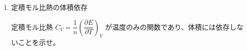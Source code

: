 \documentclass[uplatex,dvipdfmx,a4paper,11pt]{jsarticle}
\newcommand{\diff}{\mathrm d}
\begin{document}
\begin{enumerate}
\begin{enumerate}
%
%
%
%
%
%
%
%
%

\item
定積モル比熱の体積依存

定積モル比熱 $C_V = \dfrac{1}{n} \left( \dfrac{\partial E}{\partial T} \right)_V$ が温度のみの関数であり、体積には依存しないことを示せ。


\end{enumerate}
\end{enumerate}
\end{document}
